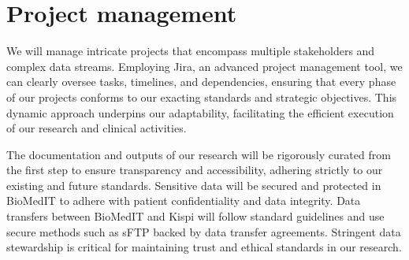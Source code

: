 \section{Project management}

We will manage intricate projects that encompass multiple stakeholders and complex data streams. 
Employing Jira, an advanced project management tool, we can clearly oversee tasks, timelines, and dependencies, ensuring that every phase of our projects conforms to our exacting standards and strategic objectives. 
This dynamic approach underpins our adaptability, facilitating the efficient execution of our research and clinical activities.

The documentation and outputs of our research will be rigorously curated from the first step to ensure transparency and accessibility, adhering strictly to our existing and future standards. 
Sensitive data will be secured and protected in BioMedIT to adhere with patient confidentiality and data integrity. 
Data transfers between BioMedIT and Kispi will follow standard guidelines and use secure methods such as sFTP backed by data transfer agreements.  
Stringent data stewardship is critical for maintaining trust and ethical standards in our research.
